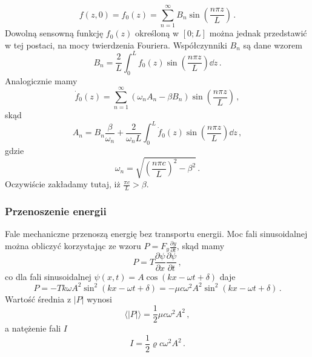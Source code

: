 \documentclass[../main.tex]{subfiles}
\begin{document}
        \begin{equation*}
            f(z,0)=f_0(z)=\sum_{n=1}^\infty B_n\sin\left(\frac{n\pi z}{L}\right)\,.
        \end{equation*}
        Dowolną sensowną funkcję \(f_0(z)\) określoną w \([0;L]\) można jednak przedstawić w tej postaci, na mocy twierdzenia Fouriera. Współczynniki \(B_n\) są dane wzorem
        \begin{equation*}
            B_n=\frac{2}{L}\int_0^Lf_0(z)\sin\left(\frac{n\pi z}{L}\right)\dd{z}\,.
        \end{equation*}
        Analogicznie mamy
        \begin{equation*}
            \dot{f}_0(z)=\sum_{n=1}^\infty (\omega_nA_n-\beta B_n)\sin\left(\frac{n\pi z}{L}\right)\,,
        \end{equation*}
        skąd
        \begin{equation*}
            A_n=B_n\frac{\beta}{\omega_n}+\frac{2}{\omega_nL}\int_0^L\dot{f}_0(z)\sin\left(\frac{n\pi z}{L}\right)\dd{z}\,,
        \end{equation*}
        gdzie
        \begin{equation*}
            \omega_n=\sqrt{\left(\frac{n\pi c}{L}\right)^2-\beta^2}\,.
        \end{equation*}
        Oczywiście zakładamy tutaj, iż \(\frac{\pi c}{L}>\beta\).
        \subsubsection{Przenoszenie energii}
        Fale mechaniczne przenoszą energię bez transportu energii. Moc fali sinusoidalnej można obliczyć korzystając ze wzoru \(P=F_y\frac{\partial y}{\partial t}\), skąd mamy
        \begin{equation*}
            P=T\frac{\partial \psi}{\partial x}\frac{\partial \psi}{\partial t}\,,
        \end{equation*}
        co dla fali sinusoidalnej \(\psi(x,t)=A\cos(kx-\omega t+\delta)\) daje
        \begin{equation*}
            P=-Tk\omega A^2\sin^2(kx-\omega t+\delta)=-\mu c\omega^2 A^2\sin^2(kx-\omega t+\delta)\,.
        \end{equation*}
        Wartość średnia z \(|P|\) wynosi
        \begin{equation*}
            \langle |P|\rangle =\frac{1}{2}\mu c\omega^2 A^2\,,
        \end{equation*}
        a natężenie fali \(I\)
        \begin{equation*}
            I=\frac{1}{2}\varrho c\omega^2A^2\,.
        \end{equation*}
\end{document}

